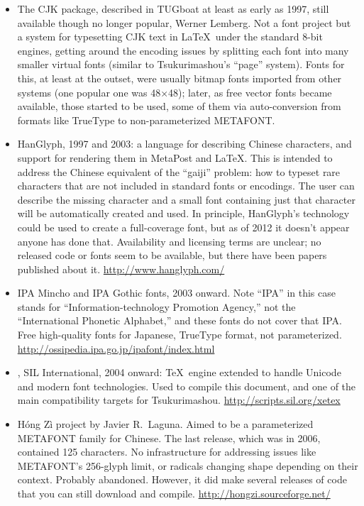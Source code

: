 \documentclass[14pt]{extarticle}
\begin{document}
\begin{itemize}
\item The CJK package, described in TUGboat at least as early as 1997, still
available though no longer popular, Werner Lemberg.  Not a font project but
a system for typesetting CJK text in \LaTeX\ under the standard 8-bit
engines, getting around the encoding issues by splitting each font into many
smaller virtual fonts (similar to Tsukurimashou's ``page'' system).  Fonts
for this, at least at the outset, were usually bitmap fonts imported from
other systems (one popular one was 48×48); later, as free vector fonts
became available, those started to be used, some of them via auto-conversion
from formats like TrueType to non-parameterized METAFONT.

\item HanGlyph, 1997 and 2003: a language for describing Chinese
characters, and support for rendering them in MetaPost and \LaTeX.
This is intended to address the Chinese equivalent of the ``gaiji''
problem: how to typeset rare characters that are not included in
standard fonts or encodings.  The user can describe the missing
character and a small font containing just that character will be
automatically created and used.  In principle, HanGlyph's technology
could be used to create a full-coverage font, but as of 2012 it
doesn't appear anyone has done that.  Availability and licensing terms
are unclear; no released code or fonts seem to be available, but there
have been papers published about it. \url{http://www.hanglyph.com/}

\item IPA Mincho and IPA Gothic fonts, 2003 onward.  Note ``IPA'' in this
case stands for ``Information-technology Promotion Agency,'' not the
``International Phonetic Alphabet,'' and these fonts do not cover that IPA.
Free high-quality fonts for Japanese, TrueType format, not parameterized. 
\url{http://ossipedia.ipa.go.jp/ipafont/index.html}

\item \XeTeX, SIL International, 2004 onward: \TeX\ engine extended to
handle Unicode and modern font technologies.  Used to compile this document,
and one of the main compatibility targets for Tsukurimashou.
\url{http://scripts.sil.org/xetex}

\item Hóng Zì project by Javier R.\ Laguna.  Aimed to be a parameterized
METAFONT family for Chinese.  The last release, which was in 2006,
contained 125 characters.  No infrastructure for addressing issues
like METAFONT's 256-glyph limit, or radicals changing shape depending
on their context.  Probably abandoned.  However, it did make several
releases of code that you can still download and compile.
\url{http://hongzi.sourceforge.net/}


\end{itemize}
\end{document}
